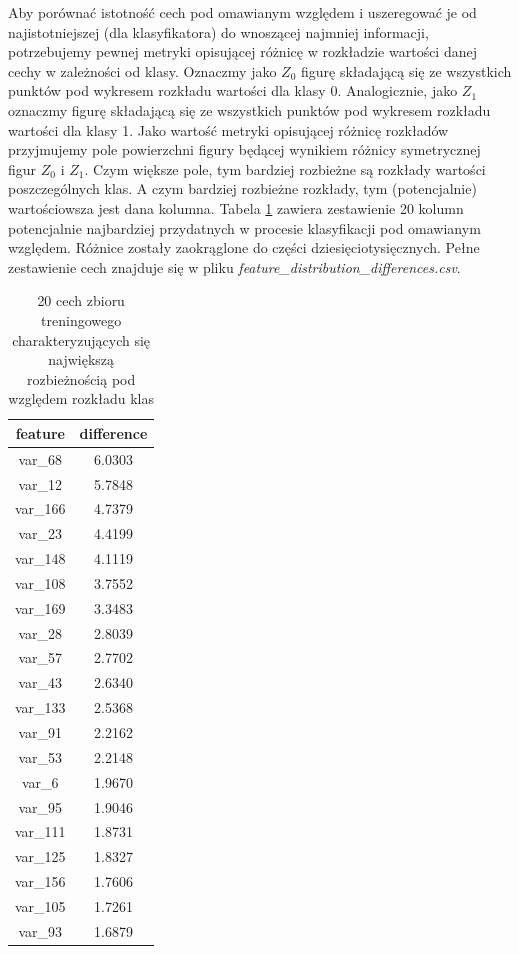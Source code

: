 ﻿\documentclass[12pt]{article}
\begin{document}
Aby porównać istotność cech pod omawianym względem i uszeregować je od najistotniejszej (dla klasyfikatora) do wnoszącej najmniej informacji, potrzebujemy pewnej metryki opisującej różnicę w rozkładzie wartości danej cechy w zależności od klasy.   
\newline Oznaczmy jako $Z_0$ figurę składającą się ze wszystkich punktów pod wykresem rozkładu wartości dla klasy 0. Analogicznie, jako $Z_1$ oznaczmy figurę składającą się ze wszystkich punktów pod wykresem rozkładu wartości dla klasy 1.
\newline Jako wartość metryki opisującej różnicę rozkładów przyjmujemy pole powierzchni figury będącej wynikiem różnicy symetrycznej figur $Z_0$ i $Z_1$. Czym większe pole, tym bardziej rozbieżne są rozkłady wartości poszczególnych klas. A czym bardziej rozbieżne rozkłady, tym (potencjalnie) wartościowsza jest dana kolumna.
\newline Tabela \ref{tab:my_label} zawiera zestawienie 20 kolumn potencjalnie najbardziej przydatnych w procesie klasyfikacji pod omawianym względem. Różnice zostały zaokrąglone do części dziesięciotysięcznych. Pełne zestawienie cech znajduje się w pliku \textit{feature\_distribution\_differences.csv}.

\begin{table}[H]
    \centering
    \begin{tabular}{|c|c|}
    \hline
    feature & difference \\
    \hline
    \hline
    var\_68 &	6.0303 \\
    \hline
    var\_12 &	5.7848 \\
    \hline
    var\_166 &	4.7379 \\
    \hline
    var\_23	& 4.4199 \\
    \hline
    var\_148	& 4.1119 \\
    \hline
    var\_108	& 3.7552 \\
    \hline
    var\_169	& 3.3483 \\
    \hline
    var\_28	& 2.8039 \\
    \hline
    var\_57	& 2.7702 \\
    \hline
    var\_43	& 2.6340 \\
    \hline
    var\_133	& 2.5368 \\
    \hline
    var\_91	& 2.2162 \\
    \hline
    var\_53	& 2.2148 \\
    \hline
    var\_6	& 1.9670 \\
    \hline
    var\_95	& 1.9046 \\
    \hline
    var\_111	& 1.8731 \\
    \hline
    var\_125	& 1.8327 \\
    \hline
    var\_156	& 1.7606 \\
    \hline
    var\_105	& 1.7261 \\
    \hline
    var\_93	& 1.6879 \\
    \hline
    \end{tabular}
    \caption{20 cech zbioru treningowego charakteryzujących się największą rozbieżnością pod względem rozkładu klas}
    \label{tab:my_label}
\end{table}
\end{document}
